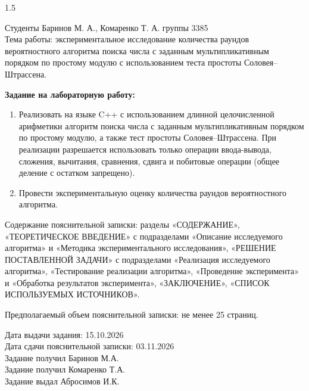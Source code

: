 \documentclass[14pt,a4paper]{extarticle}
\begin{document}
\begin{spacing}{1.5} 

\noindent Студенты Баринов М. А., Комаренко Т. А. группы 3385 \\
Тема работы: экспериментальное исследование количества раундов вероятностного алгоритма поиска числа с заданным мультипликативным порядком по простому модулю с использованием теста простоты Соловея–Штрассена.

\vspace{0.5cm}
\noindent \textbf{Задание на лабораторную работу:}
\begin{enumerate}
    \item Реализовать на языке C++ с использованием длинной целочисленной арифметики алгоритм поиска числа с заданным мультипликативным порядком по простому модулю, а также тест простоты Соловея–Штрассена. При реализации разрешается использовать только операции ввода-вывода, сложения, вычитания, сравнения, сдвига и побитовые операции (общее деление с остатком запрещено).
    \item Провести экспериментальную оценку количества раундов вероятностного алгоритма.
\end{enumerate}

\noindent Содержание пояснительной записки: разделы «СОДЕРЖАНИЕ», «ТЕОРЕТИЧЕСКОЕ ВВЕДЕНИЕ» с подразделами «Описание исследуемого алгоритма» и «Методика экспериментального исследования», «РЕШЕНИЕ ПОСТАВЛЕННОЙ ЗАДАЧИ» с подразделами «Реализация исследуемого алгоритма», «Тестирование реализации алгоритма», «Проведение эксперимента» и «Обработка результатов эксперимента», «ЗАКЛЮЧЕНИЕ», «СПИСОК ИСПОЛЬЗУЕМЫХ ИСТОЧНИКОВ».

\noindent Предполагаемый объем пояснительной записки: не менее 25 страниц.

\vspace{1.5cm}
\newpage
\noindent Дата выдачи задания: 15.10.2026 \\
Дата сдачи пояснительной записки: 03.11.2026 \\
Задание получил \underline{\hspace{3cm}} Баринов М.А. \\
Задание получил \underline{\hspace{3cm}} Комаренко Т.А. \\
Задание выдал \underline{\hspace{3cm}} Абросимов И.К.

\end{spacing}

\newpage
\makeatletter
\renewcommand{\numberline}[1]{}
\makeatother
\end{document}
